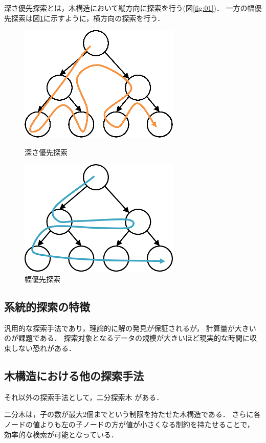\documentclass[12pt,dvipdfmx]{jarticle}
\begin{document}
深さ優先探索とは，木構造において縦方向に探索を行う(図\ref{fig:01})．
一方の幅優先探索は図\ref{fig:02}に示すように，横方向の探索を行う．
\begin{figure}[h]
	\begin{minipage}{0.5\textwidth}
		\centering
		\includegraphics{fig01.png}
			\caption{深さ優先探索}
			\label{fig:01}
	\end{minipage}
	\begin{minipage}{0.5\textwidth}
		\includegraphics{fig02.png}
		\caption{幅優先探索}
		\label{fig:02}
	\end{minipage}
\end{figure}
\vspace{-1cm}
\subsection*{系統的探索の特徴}
汎用的な探索手法であり，理論的に解の発見が保証されるが，
計算量が大きいのが課題である．
探索対象となるデータの規模が大きいほど現実的な時間に収束しない恐れがある．
\vspace{-1cm}
\subsection*{木構造における他の探索手法}
それ以外の探索手法として，二分探索木 \cite{二分木} がある．

二分木は，子の数が最大2個までという制限を持たせた木構造である．
さらに各ノードの値よりも左の子ノードの方が値が小さくなる制約を持たせることで，
効率的な検索が可能となっている．
\end{document}
